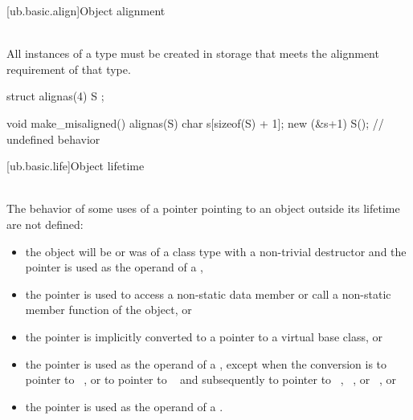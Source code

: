 [ub.basic.align]{Object alignment}

\pnum
{} \\
All instances of a type must be created in storage that meets the alignment
requirement of that type.

\pnum
\begin{example}
\begin{codeblock}
struct alignas(4) S {};

void make_misaligned()
{
    alignas(S) char s[sizeof(S) + 1];
    new (&s+1) S();     // undefined behavior
}
\end{codeblock}
\end{example}

[ub.basic.life]{Object lifetime}

\pnum
{} \\
The behavior of some uses of a pointer
pointing to an object outside its lifetime
are not defined:
\begin{itemize}
\item
  the object will be or was of a class type with a non-trivial destructor
  and the pointer is used as the operand of a ,
\item
  the pointer is used to access a non-static data member or call a
  non-static member function of the object, or
\item
  the pointer is implicitly converted to a pointer
  to a virtual base class, or
\item
  the pointer is used as the operand of a
  , except when the conversion
  is to pointer to \cv{}~, or to pointer to \cv{}~
  and subsequently to pointer to
  \cv{}~,
  \cv{}~, or
  \cv{}~, or
\item
  the pointer is used as the operand of a
  .
\end{itemize}

